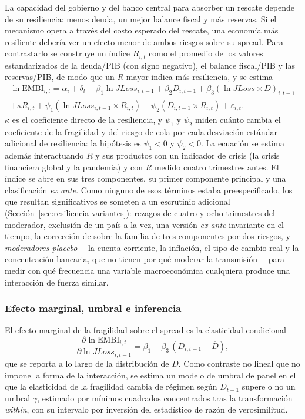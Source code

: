 La capacidad del gobierno y del banco central para absorber un rescate depende de su resiliencia: menos deuda, un mejor balance fiscal y más reservas. Si el mecanismo opera a través del costo esperado del rescate, una economía más resiliente debería ver un efecto menor de ambos riesgos sobre su spread. Para contrastarlo se construye un índice $R_{i,t}$ como el promedio de los valores estandarizados de la deuda/PIB (con signo negativo), el balance fiscal/PIB y las reservas/PIB, de modo que un $R$ mayor indica más resiliencia, y se estima
\begin{multline}
\ln\mathrm{EMBI}_{i,t}=\alpha_i+\delta_t+\beta_1\ln JLoss_{i,t-1}+\beta_2D_{i,t-1}+\beta_3(\ln JLoss\times D)_{i,t-1}\\
+\kappa R_{i,t}+\psi_1(\ln JLoss_{i,t-1}\times R_{i,t})+\psi_2(D_{i,t-1}\times R_{i,t})+\varepsilon_{i,t}.
\label{eq:resiliencia}
\end{multline}
$\kappa$ es el coeficiente directo de la resiliencia, y $\psi_1$ y $\psi_2$ miden cuánto cambia el coeficiente de la fragilidad y del riesgo de cola por cada desviación estándar adicional de resiliencia: la hipótesis es $\psi_1<0$ y $\psi_2<0$. La ecuación se estima además interactuando $R$ y sus productos con un indicador de crisis (la crisis financiera global y la pandemia) y con $R$ medido cuatro trimestres antes. El índice se abre en sus tres componentes, su primer componente principal y una clasificación \textit{ex ante}. Como ninguno de esos términos estaba preespecificado, los que resultan significativos se someten a un escrutinio adicional (Sección~\ref{sec:resiliencia-variantes}): rezagos de cuatro y ocho trimestres del moderador, exclusión de un país a la vez, una versión \textit{ex ante} invariante en el tiempo, la corrección de \citet{Holm1979} sobre la familia de tres componentes por dos riesgos, y \emph{moderadores placebo} ---la cuenta corriente, la inflación, el tipo de cambio real y la concentración bancaria, que no tienen por qué moderar la transmisión--- para medir con qué frecuencia una variable macroeconómica cualquiera produce una interacción de fuerza similar.

\subsubsection{Efecto marginal, umbral e inferencia}
\label{sec:est-inferencia}

El efecto marginal de la fragilidad sobre el spread es la elasticidad condicional
\[ \frac{\partial\ln\mathrm{EMBI}_{i,t}}{\partial\ln JLoss_{i,t-1}}=\beta_1+\beta_3\,(D_{i,t-1}-\overline D), \]
que se reporta a lo largo de la distribución de $D$. Como contraste no lineal que no impone la forma de la interacción, se estima un modelo de umbral de panel \citep{Hansen1999,Hansen2000} en el que la elasticidad de la fragilidad cambia de régimen según $D_{t-1}$ supere o no un umbral $\gamma$, estimado por mínimos cuadrados concentrados tras la transformación \textit{within}, con su intervalo por inversión del estadístico de razón de verosimilitud.

